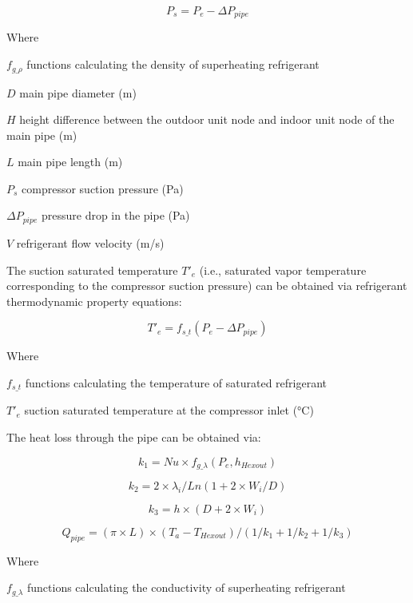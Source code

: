 \begin{equation}
  P_s=P_e-\Delta{P_{pipe}}
\end{equation}

Where

$f_{g\_\rho}$	functions calculating the density of superheating refrigerant 

$D$ main pipe diameter (m) 

$H$ height difference between the outdoor unit node and indoor unit node of the main pipe (m)

$L$ main pipe length (m) 

$P_s$ compressor suction pressure (Pa) 

$\Delta{P_{pipe}}$ pressure drop in the pipe (Pa)

$V$ refrigerant flow velocity (m/s)

The suction saturated temperature $T'_e$ (i.e., saturated vapor temperature corresponding to the compressor suction pressure) can be obtained via refrigerant thermodynamic property equations:

\begin{equation}
  T'_e=f_{s\_t}(P_e-\Delta{P_{pipe}})
\end{equation}

Where

$f_{s\_t}$	functions calculating the temperature of saturated refrigerant

$T'_e$   	suction saturated temperature at the compressor inlet (°C)

The heat loss through the pipe can be obtained via:

\begin{equation}
k_1=Nu\times{f_{g\_\lambda}(P_e,h_{Hexout})}
\end{equation}

\begin{equation}k_2=2\times{\lambda_i}/Ln(1+2\times{W_i}/D)\end{equation}

\begin{equation}k_3=h\times(D+2\times{W_i})\end{equation}

\begin{equation}Q_{pipe}=(\pi\times{L})\times(T_a-T_{Hexout})/(1/k_1+1/k_2+1/k_3)\end{equation}

Where

$f_{g\_\lambda}$	functions calculating the conductivity of superheating refrigerant 

